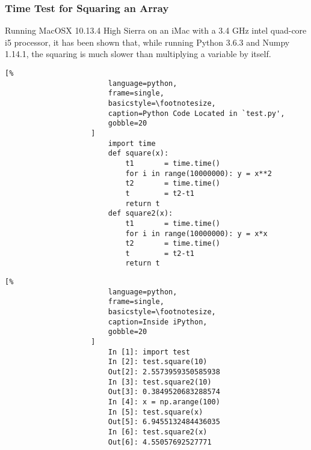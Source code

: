 \documentclass[crop=false,class=book,oneside]{standalone}
\begin{document}
            \subsubsection{Time Test for Squaring an Array}
                Running MacOSX 10.13.4 High Sierra on an iMac with a 3.4
                GHz intel quad-core i5 processor, it has been shown that,
                while running Python 3.6.3 and Numpy 1.14.1, the squaring
                is much slower than multiplying a variable by
                itself.\newline
                \begin{minipage}[t]{.48\textwidth}
                    \centering
                    \begin{lstlisting}[%
                        language=python,
                        frame=single,
                        basicstyle=\footnotesize,
                        caption=Python Code Located in `test.py',
                        gobble=20
                    ]
                        import time
                        def square(x):
                            t1       = time.time()
                            for i in range(10000000): y = x**2
                            t2       = time.time()
                            t        = t2-t1
                            return t
                        def square2(x):
                            t1       = time.time()
                            for i in range(10000000): y = x*x
                            t2       = time.time()
                            t        = t2-t1
                            return t
                    \end{lstlisting}
                \end{minipage}\hfill
                \begin{minipage}[t]{.48\textwidth}
                    \centering
                    \begin{lstlisting}[%
                        language=python,
                        frame=single,
                        basicstyle=\footnotesize,
                        caption=Inside iPython,
                        gobble=20
                    ]
                        In [1]: import test
                        In [2]: test.square(10)
                        Out[2]: 2.5573959350585938
                        In [3]: test.square2(10)
                        Out[3]: 0.3849520683288574
                        In [4]: x = np.arange(100)
                        In [5]: test.square(x)
                        Out[5]: 6.9455132484436035
                        In [6]: test.square2(x)
                        Out[6]: 4.55057692527771
                    \end{lstlisting}
                \end{minipage}\newline
\end{document}
